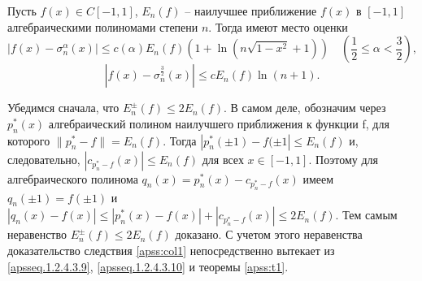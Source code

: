 \begin{corollary}\label{apss:col1} Пусть $f(x)\in C[-1,1]$, $E_n(f)$ -- наилучшее приближение $f(x)$ в $[-1,1]$ алгебраическими полиномами степени $n$. Тогда имеют место оценки
$$|f(x)-\sigma_n^\alpha(x)|\le c(\alpha)E_n(f)(1+\ln(n\sqrt{1-x^2}+1))\quad(\frac12\le\alpha<\frac32),$$
$$|f(x)-\sigma_n^{\frac32}(x)|\le c E_n(f)\ln(n+1).$$
\end{corollary}

Убедимся сначала, что $E^\pm_n(f)\le2E_n(f)$. В самом деле, обозначим через $p_n^*(x)$ алгебраический полином наилучшего приближения к функции f, для которого $\|p_n^*-f\|=E_n(f)$. Тогда $|p_n^*(\pm1)-f(\pm1|\le E_n(f)$ и, следовательно, $|c_{p_n^*-f}(x)|\le E_n(f)$ для всех $x\in [-1,1]$. Поэтому для алгебраического полинома  $q_n(x)=p_n^*(x)-c_{p_n^*-f}(x)$ имеем $q_n(\pm1)=f(\pm1)$  и  $|q_n(x)-f(x)|\le |p_n^*(x)-f(x)|+|c_{p_n^*-f}(x)|\le 2E_n(f)$. Тем самым неравенство $E^\pm_n(f)\le2E_n(f)$ доказано. С учетом этого неравенства  доказательство  следствия \ref{apss:col1} непосредственно вытекает из \eqref{apsseq.1.2.4.3.9}, \eqref{apsseq.1.2.4.3.10} и теоремы \ref{apss:t1}.

